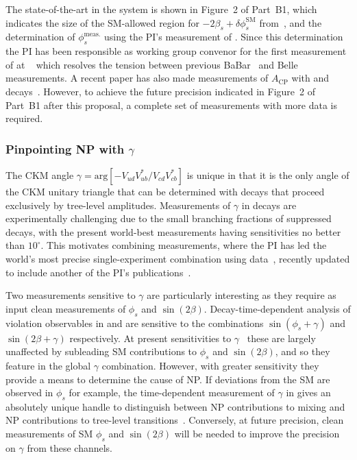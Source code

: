 \documentclass[11pt,a4paper]{article}
\begin{document}
The state-of-the-art in the \HepProcess{\PB\to\PD\PD} system is shown in Figure~2 of Part~B1, which indicates the size of the SM-allowed region for $-2\beta_{s} + \delta\phi^{\text{SM}}_s$ from~\cite{Jung:2014jfa}, and the \LHCb determination  of $\phi_s^{\text{meas.}}$ using the PI's measurement of \HepProcess{\PBs\to\PDsplus\PDsminus}. 
Since this determination the PI has been responsible as working group convenor for the first measurement of \HepProcess{\PBzero\to\PDplus\PDminus} at \LHCb~\cite{Aaij:2016yip} which resolves the tension between previous BaBar~\cite{Aubert:2008ah} and Belle~\cite{Rohrken:2012ta} measurements. A recent \LHCb paper has also made measurements of $A_\text{CP}$ with \HepProcess{\PBminus\to\PDminus\PDzero} and \HepProcess{\PBminus\to\PDsminus\PDzero} decays~\cite{Aaij:2018dxv}. However, to achieve the future precision indicated in Figure~2 of Part~B1 after this proposal, a complete set of measurements with more data is required. 

\subsubsection{Pinpointing NP with $\gamma$}
The CKM angle $\gamma= \mathrm{arg} [-V_{ud}V_{ub}^{*}/V_{cd}V_{cb}^{*}]$ is unique in that it is the only angle of the CKM unitary triangle that can be determined with decays that proceed exclusively by tree-level amplitudes. 
 Measurements of $\gamma$ in  decays are experimentally challenging due to the small branching fractions of suppressed decays, with the present world-best measurements having sensitivities no better than $10^{\circ}$. This motivates combining measurements, where the PI has led the world's most precise single-experiment combination using \LHCb data~\cite{Aaij:2016kjh}, recently updated to include another of the PI's publications~\cite{Aaij:2018kpq,Kenzie:2018oob}.
 
 
Two measurements sensitive to $\gamma$ are particularly interesting as they require as input clean measurements of $\phi_s$ and $\sin(2\beta)$. Decay-time-dependent analysis of \CP violation observables in \HepProcess{\PBs\to\PDs\PK} and \HepProcess{\PB\to\PD\Ppi} are sensitive to the combinations $\sin(\phi_s + \gamma)$ and $\sin(2\beta + \gamma)$ respectively. At present sensitivities to $\gamma$~\cite{Aaij:2017lff,Aaij:2018kpq} these are largely unaffected by subleading SM contributions to $\phi_s$ and $\sin(2\beta)$, and so they feature in the global \LHCb $\gamma$ combination. However, with greater sensitivity they provide a means to determine the cause of NP. If deviations from the SM are observed in $\phi_s$ for example, the time-dependent measurement of $\gamma$ in \HepProcess{\PBs\to\PDs\PK} gives an absolutely unique handle to distinguish between NP contributions to \PBs mixing and NP contributions to tree-level \HepProcess{\Pqb\to\Pqc} transitions~\cite{Brod:2014bfa}. Conversely, at future precision, clean measurements of SM $\phi_s$ and $\sin(2\beta)$ will be needed to improve the precision on $\gamma$ from these channels. 
\end{document}
